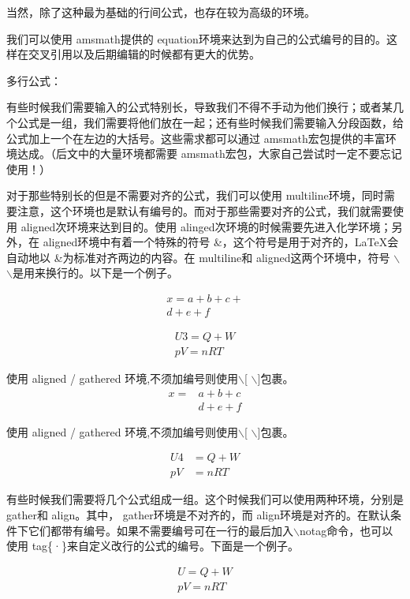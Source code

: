 \documentclass[UTF8]{ctexart}
\begin{document}
当然，除了这种最为基础的行间公式，也存在较为高级的环境。

我们可以使用 amsmath提供的 equation环境来达到为自己的公式编号的目的。这样在交叉引用以及后期编辑的时候都有更大的优势。

{\Large 多行公式：}

有些时候我们需要输入的公式特别长，导致我们不得不手动为他们换行；或者某几个公式是一组，我们需要将他们放在一起；还有些时候我们需要输入分段函数，给公式加上一个在左边的大括号。这些需求都可以通过 amsmath宏包提供的丰富环境达成。（后文中的大量环境都需要 amsmath宏包，大家自己尝试时一定不要忘记使用！）

对于那些特别长的但是不需要对齐的公式，我们可以使用 multiline环境，同时需要注意，这个环境也是默认有编号的。而对于那些需要对齐的公式，我们就需要使用 aligned次环境来达到目的。使用 alinged次环境的时候需要先进入化学环境；另外，在 aligned环境中有着一个特殊的符号 \&，这个符号是用于对齐的，LaTeX会自动地以 \&为标准对齐两边的内容。在 multiline和 aligned这两个环境中，符号 $\backslash$$\backslash$是用来换行的。以下是一个例子。

\begin{multline}
x =a+b+c + \\
d+e+f
\end{multline}

\begin{multline}
U3 = Q + W \\
pV = nRT
\end{multline}


使用 aligned / gathered 环境,不须加编号则使用$\backslash$[ $\backslash$]包裹。
\[
\begin{aligned}
	x =&a+b+c\\
	&d+e+f
\end{aligned}
\]

使用 aligned / gathered 环境,不须加编号则使用$\backslash$[ $\backslash$]包裹。

\[
\begin{aligned}
U4 &= Q + W \\
pV &= nRT
\end{aligned}
\]


有些时候我们需要将几个公式组成一组。这个时候我们可以使用两种环境，分别是 gather和 align。其中， gather环境是不对齐的，而 align环境是对齐的。在默认条件下它们都带有编号。如果不需要编号可在一行的最后加入$\backslash$notag命令，也可以使用 tag\{·\}来自定义改行的公式的编号。下面是一个例子。

\begin{gather}
U =Q +W \tag{1.1}\\
pV =nRT
\end{gather}
\end{document}

